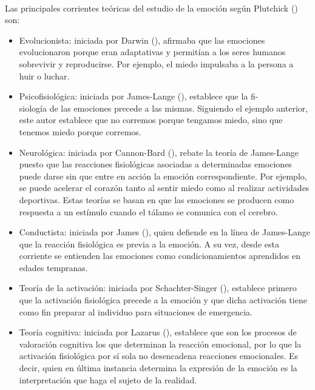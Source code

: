 \paragraph{}
Las principales corrientes teóricas del estudio de la emoción según Plutchick (\citeyear{plutchik1980emotion}) son:
\begin{itemize}
    \item Evolucionista: iniciada por Darwin (\citeyear{darwin1967expresion}), afirmaba que las emociones evolucionaron porque eran adaptativas y permitían a los seres humanos sobrevivir y reproducirse. Por ejemplo, el miedo impulsaba a la persona a huir o luchar.
    
    \item Psicofisiológica: iniciada por James-Lange (\citeyear{emotionJames}), establece que la fi-\\siología de las emociones precede a las mismas. Siguiendo el ejemplo anterior, este autor establece que no corremos porque tengamos miedo, sino que tenemos miedo porque corremos.
    
    \item Neurológica: iniciada por Cannon-Bard (\citeyear{emotionCannon}), rebate la teoría de James-Lange puesto que las reacciones fisiológicas asociadas a determinadas emociones puede darse sin que entre en acción la emoción correspondiente. Por ejemplo, se puede acelerar el corazón tanto al sentir miedo como al realizar actividades deportivas. Estas teorías se basan en que las emociones se producen como respuesta a un estímulo cuando el tálamo se comunica con el cerebro.
    
    \item Conductista: iniciada por James (\citeyear{james2013principles}), quien defiende en la línea de James-Lange que la reacción fisiológica es previa a la emoción. A su vez, desde esta corriente se entienden las emociones como condicionamientos aprendidos en edades tempranas.
    
    \item Teoría de la activación: iniciada por Schachter-Singer (\citeyear{schachter1962cognitive}), establece primero que la activación fisiológica precede a la emoción y que dicha activación tiene como fin preparar al individuo para situaciones de emergencia.

    \item Teoría cognitiva: iniciada por Lazarus (\citeyear{lazarus1970towards}), establece que son los procesos de valoración cognitiva los que determinan la reacción emocional, por lo que la activación fisiológica por sí sola no desencadena reacciones emocionales. Es decir, quien en última instancia determina la expresión de la emoción es la interpretación que haga el sujeto de la realidad.
\end{itemize}

